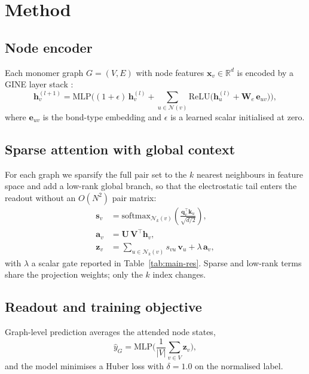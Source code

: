 \section{Method}
\label{sec:method}

\subsection{Node encoder}
Each monomer graph $G=(V,E)$ with node features $\mathbf{x}_v\in\mathbb{R}^{d}$
is encoded by a GINE layer stack \cite{zhang2023gnn}:
\begin{equation}
\mathbf{h}_v^{(l+1)} = \mathrm{MLP}\Big((1+\epsilon)\,\mathbf{h}_v^{(l)}
  + \sum_{u\in\mathcal{N}(v)} \mathrm{ReLU}\big(\mathbf{h}_u^{(l)}
  + \mathbf{W}_e\,\mathbf{e}_{uv}\big)\Big),
\label{eq:gine}
\end{equation}
where $\mathbf{e}_{uv}$ is the bond-type embedding and $\epsilon$ is a learned
scalar initialised at zero.

\subsection{Sparse attention with global context}
For each graph we sparsify the full pair set to the $k$ nearest neighbours in
feature space and add a low-rank global branch, so that the electrostatic tail
enters the readout without an $O(N^2)$ pair matrix:
\begin{align}
  \mathbf{s}_v &= \mathrm{softmax}_{\mathcal{N}_k(v)}\!\left(
     \frac{\mathbf{q}_v^{\top}\mathbf{k}_u}{\sqrt{d/2}} \right), \label{eq:sparse}\\
  \mathbf{a}_v &= \mathbf{U}\,\mathbf{V}^{\!\top}\mathbf{h}_v, \label{eq:lowrank}\\
  \mathbf{z}_v &= \sum_{u\in\mathcal{N}_k(v)} s_{vu}\,\mathbf{v}_u
     + \lambda\,\mathbf{a}_v, \label{eq:attn}
\end{align}
with $\lambda$ a scalar gate reported in Table~\ref{tab:main-res}. Sparse and
low-rank terms share the projection weights; only the $k$ index changes.

\subsection{Readout and training objective}
Graph-level prediction averages the attended node states,
\begin{equation}
\hat{y}_G = \mathrm{MLP}\Big(\frac{1}{|V|}\sum_{v\in V}\mathbf{z}_v\Big),
\label{eq:readout}
\end{equation}
and the model minimises a Huber loss with $\delta=1.0$ on the normalised label.

